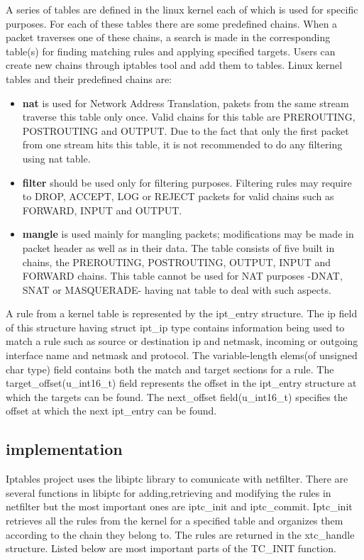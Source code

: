 {{A series of tables are defined in the linux kernel each of which is used for specific purposes. For each of these tables there are some predefined chains. When a packet traverses one of these chains, a search is made in the corresponding table(s) for finding matching rules and applying specified targets. Users can create new chains through iptables tool and add them to tables.
Linux kernel tables and their predefined chains are:       
\begin{itemize}
\item {\bf nat} is used for Network Address Translation, pakets from the same stream traverse this table only once. Valid chains for this table are PREROUTING, POSTROUTING and OUTPUT. Due to the fact that only the first packet from one stream hits this table, it is not recommended to do any filtering using nat table.
\item {\bf filter} should be used only for filtering purposes. Filtering rules may require to DROP, ACCEPT, LOG or REJECT packets for valid chains such as FORWARD, INPUT and OUTPUT.
\item {\bf mangle} is used mainly for mangling packets; modifications may be made in packet header as well as in their data. The table consists of five built in chains, the PREROUTING, POSTROUTING, OUTPUT, INPUT and FORWARD chains. This table cannot be used for NAT purposes -DNAT, SNAT or MASQUERADE- having nat table to deal with such aspects. 
\end{itemize}

A rule from a kernel table is represented by the ipt_entry structure. The ip field of this structure having struct ipt_ip type  contains information being used to match a rule such as source or destination ip and netmask, incoming or outgoing interface name and netmask and protocol. The variable-length elems(of unsigned char type) field contains both the match and target sections for a rule. The target_offset(u_int16_t) field represents the offset in the ipt_entry structure at which the targets can be found. The next_offset field(u_int16_t) specifies the offset at which the next ipt_entry can be found.   

\subsection{\project implementation}
\label{sub-sec:nat-lklnet}
Iptables project uses the libiptc library to comunicate with netfilter. There are several functions in libiptc for adding,retrieving and modifying the rules in netfilter but the most important ones are iptc_init and iptc_commit. 
Iptc_init retrieves all the rules from the kernel for a specified table and organizes them according to the chain they belong to. The rules are returned in the xtc_handle structure. Listed below are most important parts of the TC_INIT function.

}}
